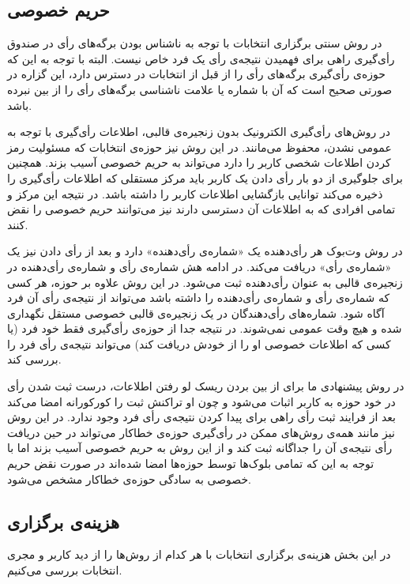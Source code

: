 \subsection{حریم خصوصی}
در روش سنتی برگزاری انتخابات با توجه به ناشناس بودن برگه‌های رأی در صندوق رأی‌گیری راهی برای فهمیدن نتیجه‌ی رأی‌ یک فرد خاص نیست. البته با توجه به این که حوزه‌ی رأی‌گیری برگه‌های رأی را از قبل از انتخابات در دسترس دارد، این گزاره در صورتی صحیح است که آن با شماره یا علامت ناشناسی برگه‌های رأی را از بین نبرده باشد.
\par 
در روش‌های رأی‌گیری الکترونیک بدون زنجیره‌ی قالبی، اطلاعات رأی‌گیری با توجه به عمومی نشدن، محفوظ می‌مانند. در این روش نیز حوزه‌ی انتخابات که مسئولیت رمز کردن اطلاعات شخصی کاربر را دارد می‌تواند به حریم خصوصی آسیب بزند. همچنین برای جلوگیری از دو بار رأی دادن یک کاربر باید مرکز مستقلی که اطلاعات رأی‌گیری را ذخیره می‌کند توانایی بازگشایی اطلاعات کاربر را داشته باشد. در نتیجه این مرکز و تمامی افرادی که به اطلاعات آن دسترسی دارند نیز می‌توانند حریم خصوصی را نقض کنند. 
\par
در روش وت‌بوک هر رأی‌دهنده یک «شماره‌ی رأی‌دهنده» دارد و بعد از رأی دادن نیز یک «شماره‌ی رأی» دریافت می‌کند. در ادامه هش شماره‌ی رأی و شماره‌ی رأی‌دهنده در زنجیره‌ی قالبی به عنوان رأی‌دهنده ثبت می‌شود. در این روش علاوه بر حوزه، هر کسی که شماره‌ی رأی و شماره‌ی رأی‌دهنده را داشته باشد می‌تواند از نتیجه‌ی رأی آن فرد آگاه شود. شماره‌های رأی‌دهندگان در یک زنجیره‌ی قالبی خصوصی مستقل نگهداری شده و هیچ وقت عمومی نمی‌شوند. در نتیجه جدا از حوزه‌ی رأی‌گیری فقط خود فرد (یا کسی که اطلاعات خصوصی او را از خودش دریافت کند) می‌تواند نتیجه‌ی رأی فرد را بررسی کند. 
\par 
در روش پیشنهادی ما برای از بین بردن ریسک لو رفتن اطلاعات، درست ثبت شدن رأی در خود حوزه به کاربر اثبات می‌شود و چون او تراکنش ثبت را کورکورانه امضا می‌کند بعد از فرایند ثبت رأی راهی برای پیدا کردن نتیجه‌ی رأی فرد وجود ندارد. در این روش نیز مانند همه‌ی روش‌های ممکن در رأی‌گیری حوزه‌ی خطاکار می‌تواند در حین دریافت رأی نتیجه‌ی آن را جداگانه ثبت کند و از این روش به حریم خصوصی آسیب بزند اما با توجه به این که تمامی بلوک‌ها توسط حوزه‌ها امضا شده‌اند در صورت نقض حریم خصوصی به سادگی حوزه‌ی خطاکار مشخص می‌شود.

\subsection{هزینه‌ی برگزاری}
در این بخش هزینه‌ی برگزاری انتخابات با هر کدام از روش‌ها را از دید کاربر و مجری انتخابات بررسی می‌کنیم.
